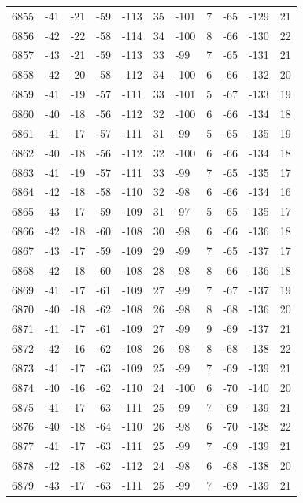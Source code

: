 \begin{table}[H]
\begin{tabular}{lllllllllll}
6855 & -41 & -21 & -59 & -113 & 35 & -101 & 7 & -65 & -129 & 21 \\
6856 & -42 & -22 & -58 & -114 & 34 & -100 & 8 & -66 & -130 & 22 \\
6857 & -43 & -21 & -59 & -113 & 33 & -99 & 7 & -65 & -131 & 21 \\
6858 & -42 & -20 & -58 & -112 & 34 & -100 & 6 & -66 & -132 & 20 \\
6859 & -41 & -19 & -57 & -111 & 33 & -101 & 5 & -67 & -133 & 19 \\
6860 & -40 & -18 & -56 & -112 & 32 & -100 & 6 & -66 & -134 & 18 \\
6861 & -41 & -17 & -57 & -111 & 31 & -99 & 5 & -65 & -135 & 19 \\
6862 & -40 & -18 & -56 & -112 & 32 & -100 & 6 & -66 & -134 & 18 \\
6863 & -41 & -19 & -57 & -111 & 33 & -99 & 7 & -65 & -135 & 17 \\
6864 & -42 & -18 & -58 & -110 & 32 & -98 & 6 & -66 & -134 & 16 \\
6865 & -43 & -17 & -59 & -109 & 31 & -97 & 5 & -65 & -135 & 17 \\
6866 & -42 & -18 & -60 & -108 & 30 & -98 & 6 & -66 & -136 & 18 \\
6867 & -43 & -17 & -59 & -109 & 29 & -99 & 7 & -65 & -137 & 17 \\
6868 & -42 & -18 & -60 & -108 & 28 & -98 & 8 & -66 & -136 & 18 \\
6869 & -41 & -17 & -61 & -109 & 27 & -99 & 7 & -67 & -137 & 19 \\
6870 & -40 & -18 & -62 & -108 & 26 & -98 & 8 & -68 & -136 & 20 \\
6871 & -41 & -17 & -61 & -109 & 27 & -99 & 9 & -69 & -137 & 21 \\
6872 & -42 & -16 & -62 & -108 & 26 & -98 & 8 & -68 & -138 & 22 \\
6873 & -41 & -17 & -63 & -109 & 25 & -99 & 7 & -69 & -139 & 21 \\
6874 & -40 & -16 & -62 & -110 & 24 & -100 & 6 & -70 & -140 & 20 \\
6875 & -41 & -17 & -63 & -111 & 25 & -99 & 7 & -69 & -139 & 21 \\
6876 & -40 & -18 & -64 & -110 & 26 & -98 & 6 & -70 & -138 & 22 \\
6877 & -41 & -17 & -63 & -111 & 25 & -99 & 7 & -69 & -139 & 21 \\
6878 & -42 & -18 & -62 & -112 & 24 & -98 & 6 & -68 & -138 & 20 \\
6879 & -43 & -17 & -63 & -111 & 25 & -99 & 7 & -69 & -139 & 21 \\

\end{tabular}
\end{table}
